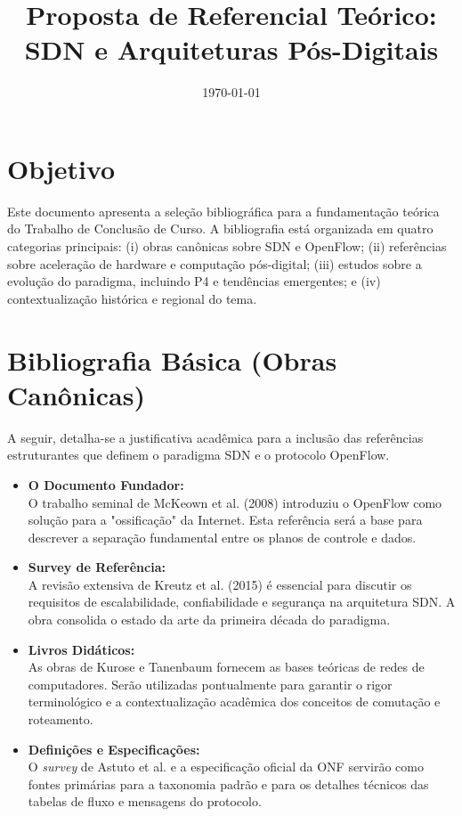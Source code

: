 \documentclass[10pt]{IEEEtran}
\title{Proposta de Referencial Teórico: SDN e Arquiteturas Pós-Digitais}
\author{
    \IEEEauthorblockN{Nico I. G. Ramos}
    \IEEEauthorblockA{
        Orientando - GRR20210574\\
    }
}
\date{\today}
\begin{document}
\maketitle

\section{Objetivo}
Este documento apresenta a seleção bibliográfica para a fundamentação teórica do Trabalho de Conclusão de Curso. A bibliografia está organizada em quatro categorias principais: (i) obras canônicas sobre SDN e OpenFlow; (ii) referências sobre aceleração de hardware e computação pós-digital; (iii) estudos sobre a evolução do paradigma, incluindo P4 e tendências emergentes; e (iv) contextualização histórica e regional do tema.

\section{Bibliografia Básica (Obras Canônicas)}
A seguir, detalha-se a justificativa acadêmica para a inclusão das referências estruturantes que definem o paradigma SDN e o protocolo OpenFlow.

\begin{itemize}
    \item \cite{McKeown:OpenFlow} \textbf{O Documento Fundador:} \\
    O trabalho seminal de McKeown et al. (2008) introduziu o OpenFlow como solução para a "ossificação" da Internet. Esta referência será a base para descrever a separação fundamental entre os planos de controle e dados.
    
    \item \cite{Kreutz:Comprehensive} \textbf{Survey de Referência:} \\
    A revisão extensiva de Kreutz et al. (2015) é essencial para discutir os requisitos de escalabilidade, confiabilidade e segurança na arquitetura SDN. A obra consolida o estado da arte da primeira década do paradigma.
    
    \item \cite{Kurose:Redes, Tanenbaum:Redes} \textbf{Livros Didáticos:} \\
    As obras de Kurose e Tanenbaum fornecem as bases teóricas de redes de computadores. Serão utilizadas pontualmente para garantir o rigor terminológico e a contextualização acadêmica dos conceitos de comutação e roteamento.
    
    \item \cite{Astuto:SDNSurvey, ONF_OpenFlow_1.5.1} \textbf{Definições e Especificações:} \\
    O \textit{survey} de Astuto et al. e a especificação oficial da ONF servirão como fontes primárias para a taxonomia padrão e para os detalhes técnicos das tabelas de fluxo e mensagens do protocolo.
\end{itemize}
\end{document}
